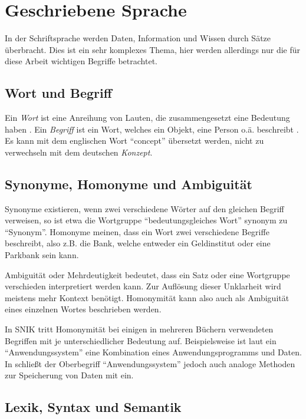 \section{Geschriebene Sprache}

In der Schriftsprache werden Daten, Information und Wissen durch Sätze überbracht.
Dies ist ein sehr komplexes Thema, hier werden allerdings nur die für diese Arbeit wichtigen Begriffe betrachtet.

\subsection{Wort und Begriff}

Ein \emph{Wort} ist eine Anreihung von Lauten, die zusammengesetzt eine Bedeutung haben \citep[S.~1185]{duden}.
Ein \emph{Begriff} ist ein Wort, welches ein Objekt, eine Person o.ä. beschreibt \citep[S.~235]{duden}.
Es kann mit dem englischen Wort \enquote{concept} übersetzt werden, nicht zu verwechseln mit dem deutschen \emph{Konzept}.

\subsection{Synonyme, Homonyme und Ambiguität}

Synonyme existieren, wenn zwei verschiedene Wörter auf den gleichen Begriff verweisen, so ist etwa die Wortgruppe \enquote{bedeutungsgleiches Wort} synonym zu \enquote{Synonym}.
Homonyme meinen, dass ein Wort zwei verschiedene Begriffe beschreibt, also z.B. die Bank, welche entweder ein Geldinstitut oder eine Parkbank sein kann.

Ambiguität oder Mehrdeutigkeit bedeutet, dass ein Satz oder eine Wortgruppe verschieden interpretiert werden kann.
Zur Auflösung dieser Unklarheit wird meistens mehr Kontext benötigt.
Homonymität kann also auch als Ambiguität eines einzelnen Wortes beschrieben werden.

In SNIK tritt Homonymität bei einigen in mehreren Büchern verwendeten Begriffen mit je unterschiedlicher Bedeutung auf.
Beispielsweise ist laut \citet{he} ein \enquote{Anwendungssystem} eine Kombination eines Anwendungsprogramms und Daten.
In \citet{ob} schließt der Oberbegriff \enquote{Anwendungssystem} jedoch auch analoge Methoden zur Speicherung von Daten mit ein.

\subsection{Lexik, Syntax und Semantik}


